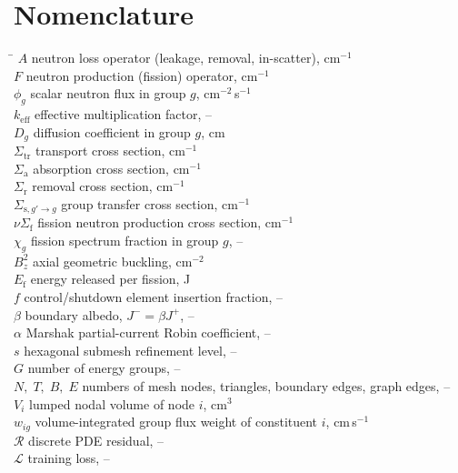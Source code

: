 \documentclass[preprint,12pt]{elsarticle}
\newcommand{\keff}{k_{\mathrm{eff}}}
\newcommand{\Sig}[1]{\Sigma_{\mathrm{#1}}}
\newcommand{\nuSigf}{\nu\Sigma_{\mathrm{f}}}
\newcommand{\Bz}{B_z^{2}}
\begin{document}
\section*{Nomenclature}
\begin{tabbing}
\hspace{2.6cm}\= \kill
$A$ \> neutron loss operator (leakage, removal, in-scatter), cm$^{-1}$ \\
$F$ \> neutron production (fission) operator, cm$^{-1}$ \\
$\phi_g$ \> scalar neutron flux in group $g$, cm$^{-2}$\,s$^{-1}$ \\
$\keff$ \> effective multiplication factor, -- \\
$D_g$ \> diffusion coefficient in group $g$, cm \\
$\Sig{tr}$ \> transport cross section, cm$^{-1}$ \\
$\Sig{a}$ \> absorption cross section, cm$^{-1}$ \\
$\Sig{r}$ \> removal cross section, cm$^{-1}$ \\
$\Sigma_{\mathrm{s},g'\rightarrow g}$ \> group transfer cross section, cm$^{-1}$ \\
$\nuSigf$ \> fission neutron production cross section, cm$^{-1}$ \\
$\chi_g$ \> fission spectrum fraction in group $g$, -- \\
$\Bz$ \> axial geometric buckling, cm$^{-2}$ \\
$E_{\mathrm{f}}$ \> energy released per fission, J \\
$f$ \> control/shutdown element insertion fraction, -- \\
$\beta$ \> boundary albedo, $J^- = \beta J^+$, -- \\
$\alpha$ \> Marshak partial-current Robin coefficient, -- \\
$s$ \> hexagonal submesh refinement level, -- \\
$G$ \> number of energy groups, -- \\
$N,\;T,\;B,\;E$ \> numbers of mesh nodes, triangles, boundary edges, graph edges, -- \\
$V_i$ \> lumped nodal volume of node $i$, cm$^{3}$ \\
$w_{ig}$ \> volume-integrated group flux weight of constituent $i$, cm\,s$^{-1}$ \\
$\mathcal{R}$ \> discrete PDE residual, -- \\
$\mathcal{L}$ \> training loss, -- \\
\end{tabbing}
\end{document}

